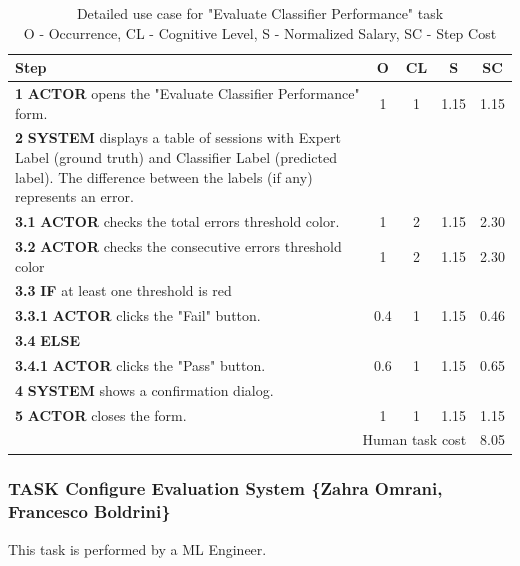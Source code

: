 \begin{table}[H]
    \centering
    \begin{tabularx}{\textwidth}{|X|c|c|c|c|}
    \hline
    \textbf{Step} & \textbf{O} & \textbf{CL} & \textbf{S} & \textbf{SC} \\
    \hline
    \textbf{1} \textbf{ACTOR} opens the "Evaluate Classifier Performance" form. & 1 & 1 & 1.15 & 1.15 \\
    \hline
    \textbf{2} \textbf{SYSTEM} displays a table of sessions with Expert Label (ground truth) and Classifier Label (predicted label). 
    The difference between the labels (if any) represents an error. & & & & \\
    \hline
    \textbf{3.1} \textbf{ACTOR} checks the total errors threshold color. &1 & 2& 1.15&2.30 \\
    \hline
    \textbf{3.2} \textbf{ACTOR} checks the consecutive errors threshold color &1 & 2& 1.15&2.30 \\
    \hline
    \textbf{3.3} \textbf{IF} at least one threshold is red &  &  & & \\
    \hline
    \textbf{3.3.1} \textbf{ACTOR} clicks the "Fail" button. &0.4 &1 & 1.15&0.46 \\
    \hline
    \textbf{3.4} \textbf{ELSE} & & & & \\
    \hline
    \textbf{3.4.1} \textbf{ACTOR} clicks the "Pass" button. &0.6 &1 & 1.15&0.65\\
    \hline
    \textbf{4} \textbf{SYSTEM} shows a confirmation dialog. & & & &\\
    \hline
    \textbf{5} \textbf{ACTOR} closes the form. &1 &1 & 1.15&1.15\\
    \hline
    \multicolumn{4}{|r|}{Human task cost} &8.05 \\
    \hline
    \end{tabularx}
    \caption{Detailed use case for "Evaluate Classifier Performance" task\\ 
    O - Occurrence, CL - Cognitive Level, S - Normalized Salary, SC - Step Cost}
    \label{table:evaluate_classifier_performance}
    \end{table}

\subsubsection{TASK Configure Evaluation System \{Zahra Omrani, Francesco Boldrini\}}
This task is performed by a ML Engineer.

